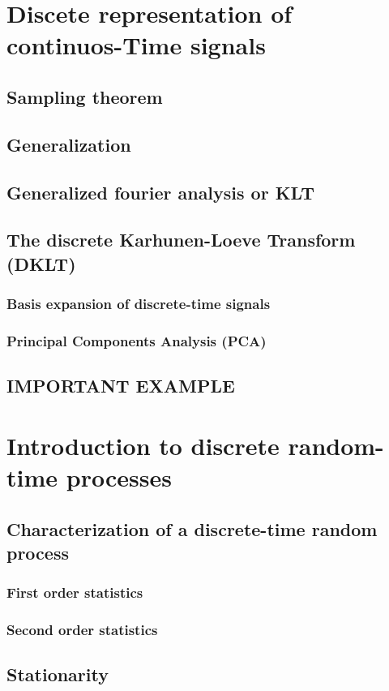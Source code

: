 \section{Discete representation of continuos-Time signals}
\subsection{Sampling theorem}
\subsection{Generalization}
\subsection{Generalized fourier analysis or KLT}
\subsection{The discrete Karhunen-Loeve Transform (DKLT)}
\subsubsection{Basis expansion of discrete-time signals}
\subsubsection{Principal Components Analysis (PCA)}
\subsection{IMPORTANT EXAMPLE}

\section{Introduction to discrete random-time processes}
\subsection{Characterization of a discrete-time random process}
\subsubsection{First order statistics}
\subsubsection{Second order statistics}
\subsection{Stationarity}
